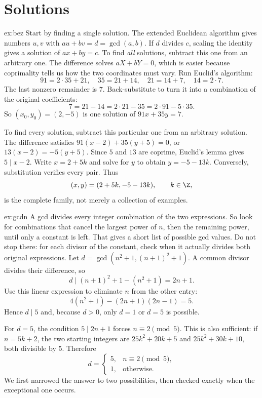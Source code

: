 \section{Solutions}

\begin{solution}{ex:bez}
\idea Start by finding a single solution. The extended Euclidean algorithm gives numbers $u,v$ with $au+bv=d=\gcd(a,b)$. If $d$ divides $c$, scaling the identity gives a solution of $ax+by=c$. To find \emph{all} solutions, subtract this one from an arbitrary one. The difference solves $aX+bY=0$, which is easier because coprimality tells us how the two coordinates must vary.
\writeup Run Euclid's algorithm:
\[
91=2\cdot35+21,\quad35=21+14,\quad
21=14+7,\quad14=2\cdot7.
\]
The last nonzero remainder is $7$. Back-substitute to turn it into a combination of the original coefficients:
\[
7=21-14=2\cdot21-35=2\cdot91-5\cdot35.
\]
So $(x_0,y_0)=(2,-5)$ is one solution of $91x+35y=7$.

To find every solution, subtract this particular one from an arbitrary solution. The difference satisfies
$91(x-2)+35(y+5)=0$, or $13(x-2)=-5(y+5)$. Since $5$ and $13$ are coprime, Euclid's lemma gives $5\mid x-2$. Write $x=2+5k$ and solve for $y$ to obtain $y=-5-13k$. Conversely, substitution verifies every pair. Thus
\[
(x,y)=(2+5k,-5-13k),\qquad k\in\Z,
\]
is the complete family, not merely a collection of examples.
\end{solution}

\begin{solution}{ex:gcdn}
\idea A gcd divides every integer combination of the two expressions. So look for combinations that cancel the largest power of $n$, then the remaining power, until only a constant is left. That gives a short list of possible gcd values. Do not stop there: for each divisor of the constant, check when it actually divides both original expressions.
\writeup Let
$d=\gcd(n^2+1,(n+1)^2+1)$. A common divisor divides their difference, so
\[
d\mid (n+1)^2+1-(n^2+1)=2n+1.
\]
Use this linear expression to eliminate $n$ from the other entry:
\[
4(n^2+1)-(2n+1)(2n-1)=5.
\]
Hence $d\mid5$ and, because $d>0$, only $d=1$ or $d=5$ is possible.

For $d=5$, the condition $5\mid2n+1$ forces $n\equiv2\pmod5$. This is also sufficient: if $n=5k+2$, the two starting integers are
$25k^2+20k+5$ and $25k^2+30k+10$, both divisible by $5$. Therefore
\[
d=\begin{cases}
5,&n\equiv2\pmod5,\\
1,&\text{otherwise}.
\end{cases}
\]
We first narrowed the answer to two possibilities, then checked exactly when the exceptional one occurs.
\end{solution}

